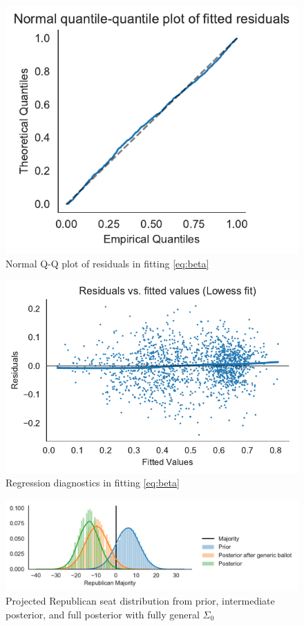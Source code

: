\documentclass[12pt, letterpaper]{article}
\begin{document}
\begin{figure}[tbh]
  \centering
  \includegraphics{qq.pdf}
  \caption{Normal Q-Q plot of residuals in fitting \eqref{eq:beta}}
  \label{fig:qq}
\end{figure}

\begin{figure}[tbh]
  \centering
  \includegraphics{diagnostics.pdf}
  \caption{Regression diagnostics in fitting \eqref{eq:beta}}
  \label{fig:diag}
\end{figure}

\begin{figure}[tbh]
  \centering
  \includegraphics[width=\textwidth]{rep_seats.pdf}
  \caption{Projected Republican seat distribution from prior, intermediate
  posterior, and full posterior with fully general $\Sigma_0$}
  \label{fig:hists}
\end{figure}
\end{document}
